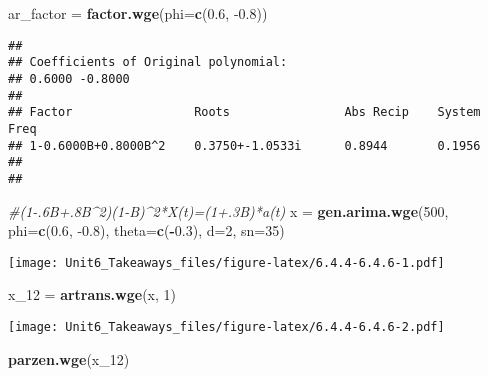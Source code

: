 \documentclass[
]{article}
\newenvironment{Shaded}{\begin{snugshade}}{\end{snugshade}}
\newcommand{\CommentTok}[1]{\textcolor[rgb]{0.56,0.35,0.01}{\textit{#1}}}
\newcommand{\DataTypeTok}[1]{\textcolor[rgb]{0.13,0.29,0.53}{#1}}
\newcommand{\DecValTok}[1]{\textcolor[rgb]{0.00,0.00,0.81}{#1}}
\newcommand{\FloatTok}[1]{\textcolor[rgb]{0.00,0.00,0.81}{#1}}
\newcommand{\KeywordTok}[1]{\textcolor[rgb]{0.13,0.29,0.53}{\textbf{#1}}}
\newcommand{\NormalTok}[1]{#1}
\newcommand{\OperatorTok}[1]{\textcolor[rgb]{0.81,0.36,0.00}{\textbf{#1}}}
\newcommand{\StringTok}[1]{\textcolor[rgb]{0.31,0.60,0.02}{#1}}
\begin{document}
\begin{Shaded}
\begin{Highlighting}[]
\NormalTok{ar_factor =}\StringTok{ }\KeywordTok{factor.wge}\NormalTok{(}\DataTypeTok{phi=}\KeywordTok{c}\NormalTok{(}\FloatTok{0.6}\NormalTok{, }\FloatTok{-0.8}\NormalTok{))}
\end{Highlighting}
\end{Shaded}

\begin{verbatim}
## 
## Coefficients of Original polynomial:  
## 0.6000 -0.8000 
## 
## Factor                 Roots                Abs Recip    System Freq 
## 1-0.6000B+0.8000B^2    0.3750+-1.0533i      0.8944       0.1956
##   
## 
\end{verbatim}

\begin{Shaded}
\begin{Highlighting}[]
\CommentTok{#(1-.6B+.8B^2)(1-B)^2*X(t)=(1+.3B)*a(t)}
\NormalTok{x =}\StringTok{ }\KeywordTok{gen.arima.wge}\NormalTok{(}\DecValTok{500}\NormalTok{, }\DataTypeTok{phi=}\KeywordTok{c}\NormalTok{(}\FloatTok{0.6}\NormalTok{, }\FloatTok{-0.8}\NormalTok{), }\DataTypeTok{theta=}\KeywordTok{c}\NormalTok{(}\OperatorTok{-}\FloatTok{0.3}\NormalTok{), }\DataTypeTok{d=}\DecValTok{2}\NormalTok{, }\DataTypeTok{sn=}\DecValTok{35}\NormalTok{)}
\end{Highlighting}
\end{Shaded}

\texttt{[image: Unit6\_Takeaways\_files/figure-latex/6.4.4-6.4.6-1.pdf]}

\begin{Shaded}
\begin{Highlighting}[]
\NormalTok{x_}\DecValTok{12}\NormalTok{ =}\StringTok{ }\KeywordTok{artrans.wge}\NormalTok{(x, }\DecValTok{1}\NormalTok{)}
\end{Highlighting}
\end{Shaded}

\texttt{[image: Unit6\_Takeaways\_files/figure-latex/6.4.4-6.4.6-2.pdf]}

\begin{Shaded}
\begin{Highlighting}[]
\KeywordTok{parzen.wge}\NormalTok{(x_}\DecValTok{12}\NormalTok{)}
\end{Highlighting}
\end{Shaded}
\end{document}
